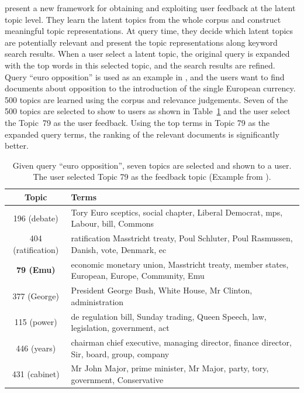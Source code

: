 \citet{Andrzejewski-2011} present a new framework for obtaining and
exploiting user feedback at the latent topic level. They learn the
latent topics from the whole corpus and construct meaningful topic
representations. At query time, they decide which latent topics are
potentially relevant and present the topic representations along
keyword search results. When a user select a latent topic, the
original query is expanded with the top words in this selected topic,
and the search results are refined. 
Query ``euro opposition'' is used as an example in \citet{Andrzejewski-2011},
and the users want to find documents about opposition to the introduction of
the single European currency. 500 topics are learned using the corpus and relevance
judgements. Seven of the 500 topics are selected to show to users as shown in
Table~\ref{tab:topic-feedback} and the user select the Topic~79 as the user feedback.
Using the top terms in Topic 79 as the expanded query terms, the ranking of
the relevant documents is significantly better.

\begin{table}[!tp]
\caption{Given query ``euro opposition'', seven topics are selected and shown to a user. The user selected Topic 79
as the feedback topic (Example from \citet{Andrzejewski-2011}).}
\label{tab:topic-feedback}
\begin{center}
\footnotesize
\setlength\tabcolsep{3pt}
\begin{tabular}{c  p{9cm} } \hline
\rowcolor{gray!50}
Topic & Terms \\ \hline \hline
196 (debate) & Tory Euro sceptics, social chapter, Liberal Democrat, mps, Labour, bill, Commons \\
404 (ratification) & ratification Masstricht treaty, Poul Schluter, Poul Rasmussen, Danish, vote, Denmark, ec \\
\textbf{79 (Emu)} & economic monetary union, Masstricht treaty, member states, European, Europe, Community, Emu \\
377 (George) & President George Bush, White House, Mr Clinton, administration \\
115 (power) & de regulation bill, Sunday trading, Queen Speech, law, legislation, government, act \\
446 (years) & chairman chief executive, managing director, finance director, Sir, board, group, company \\
431 (cabinet) & Mr John Major, prime minister, Mr Major, party, tory, government, Conservative \\
\hline
\end{tabular}
\end{center}
\end{table}

